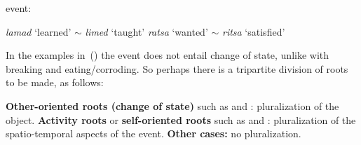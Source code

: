 \begin{exe}
\begin{xlist}
\begin{exe}
\begin{xlist}
\begin{exe}
\begin{xlist}
\begin{exe}
\begin{exe}
\begin{xlist}
\begin{exe}
\begin{xlist}
\begin{exe}
\begin{xlist}
\begin{exe}
\begin{xlist}
\begin{exe}
\begin{xlist}
\begin{exe}
\begin{xlist}
\begin{exe}
\begin{xlist}
\begin{exe}
\begin{xlist}
\begin{exe}
\begin{xlist}
\begin{exe}
\begin{xlist}
\begin{exe}
\begin{xlist}
\begin{exe}
\begin{xlist}
\begin{exe}
\begin{exe}
\begin{xlist}
\begin{exe}
\begin{xlist}
\begin{exe}
\begin{xlist}
\begin{exe}
\begin{xlist}
{\begin{exe}
\begin{xlist}
\begin{exe}
\begin{xlist}
\begin{exe}
\begin{xlist}
\begin{exe}
\begin{xlist}
\begin{xlist}
\begin{xlist}
\begin{exe}
\begin{xlist}
\begin{xlist}
\begin{xlist}
\begin{exe}
\begin{exe}
\begin{xlist}
\begin{exe}
\begin{xlist}
\begin{exe}
\begin{xlist}
\begin{exe}
\begin{xlist}
\begin{exe}
\begin{xlist}
\begin{exe}
\begin{xlist}
\begin{exe}
\begin{exe}
\begin{xlist}
\begin{xlist}
\begin{exe}
\begin{xlist}
\begin{exe}
\begin{xlist}
\begin{exe}
\begin{xlist}
\begin{exe}
\begin{xlist}
\begin{exe}
\begin{xlist}
\begin{exe}
\begin{xlist}
\begin{exe}
\begin{exe}
\begin{xlist}
\begin{exe}
\begin{xlist}
\begin{exe}
\begin{xlist}
\begin{exe}
\begin{xlist}
event:
 \begin{exe}
 \ex  
 \begin{xlist} 
 	\ex  \emph{lamad} `learned' $\sim$ \emph{limed} `taught' 
 	\ex   \emph{ratsa} `wanted' $\sim$ \emph{ritsa} `satisfied' 
 \z
\z 

In the examples in~(\lastx) the event does not entail change of state, unlike with breaking and eating/corroding. So perhaps there is a tripartite division of roots to be made, as follows:
 \begin{exe}
 \ex  
 \begin{xlist} 
 	\ex   \textbf{Other-oriented roots (change of state)} such as  and : pluralization of the object. 
 	\ex   \textbf{Activity roots} or \textbf{self-oriented roots} such as  and : pluralization of the spatio-temporal aspects of the event. 
 	\ex  \textbf{Other cases:} no pluralization. 
 \z
\z 


\end{xlist}
\end{exe}
\end{xlist}
\end{exe}
\end{xlist}
\end{exe}
\end{xlist}
\end{exe}
\end{xlist}
\end{exe}
\end{xlist}
\end{exe}
\end{exe}
\end{xlist}
\end{exe}
\end{xlist}
\end{exe}
\end{xlist}
\end{exe}
\end{xlist}
\end{exe}
\end{xlist}
\end{exe}
\end{xlist}
\end{exe}
\end{xlist}
\end{xlist}
\end{exe}
\end{exe}
\end{xlist}
\end{exe}
\end{xlist}
\end{exe}
\end{xlist}
\end{exe}
\end{xlist}
\end{exe}
\end{xlist}
\end{exe}
\end{xlist}
\end{exe}
\end{exe}
\end{xlist}
\end{xlist}
\end{xlist}
\end{exe}
\end{xlist}
\end{xlist}
\end{xlist}
\end{exe}
\end{xlist}
\end{exe}
\end{xlist}
\end{exe}
\end{xlist}
\end{exe}}
\end{xlist}
\end{exe}
\end{xlist}
\end{exe}
\end{xlist}
\end{exe}
\end{xlist}
\end{exe}
\end{exe}
\end{xlist}
\end{exe}
\end{xlist}
\end{exe}
\end{xlist}
\end{exe}
\end{xlist}
\end{exe}
\end{xlist}
\end{exe}
\end{xlist}
\end{exe}
\end{xlist}
\end{exe}
\end{xlist}
\end{exe}
\end{xlist}
\end{exe}
\end{xlist}
\end{exe}
\end{xlist}
\end{exe}
\end{xlist}
\end{exe}
\end{exe}
\end{xlist}
\end{exe}
\end{xlist}
\end{exe}
\end{xlist}
\end{exe}
